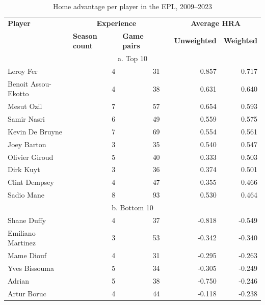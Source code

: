 \begin{table}[htbp]
    \begin{spacing}{1.5}
    \small
    \centering
    \caption{Home advantage per player in the EPL, 2009--2023}
    \label{tab:hra_per_player}
    \begin{tabular}{lrrrrr}
        \toprule
        \toprule
        \textbf{Player} & \multicolumn{2}{c}{\textbf{Experience}} &       & \multicolumn{2}{c}{\textbf{Average HRA}} \\
        \cmidrule{2-3}\cmidrule{5-6}          & \multicolumn{1}{l}{\textbf{Season count}} & \multicolumn{1}{l}{\textbf{Game pairs}} &       & \multicolumn{1}{l}{\textbf{Unweighted}} & \multicolumn{1}{l}{\textbf{Weighted}} \\
        \midrule
        \multicolumn{6}{c}{a. Top 10} \\
        \midrule
        Leroy Fer & 4     & 31    &       & 0.857 & 0.717 \\
        Benoit Assou-Ekotto & 4     & 38    &       & 0.631 & 0.640 \\
        Mesut Ozil & 7     & 57    &       & 0.654 & 0.593 \\
        Samir Nasri & 6     & 49    &       & 0.559 & 0.575 \\
        Kevin De Bruyne & 7     & 69    &       & 0.554 & 0.561 \\
        Joey Barton & 3     & 35    &       & 0.540 & 0.547 \\
        Olivier Giroud & 5     & 40    &       & 0.333 & 0.503 \\
        Dirk Kuyt & 3     & 36    &       & 0.374 & 0.501 \\
        Clint Dempsey & 4     & 47    &       & 0.355 & 0.466 \\
        Sadio Mane & 8     & 93    &       & 0.530 & 0.464 \\
        \midrule
        \multicolumn{6}{c}{b. Bottom 10} \\
        \midrule
        Shane Duffy & 4     & 37    &       & -0.818 & -0.549 \\
        Emiliano Martinez & 3     & 53    &       & -0.342 & -0.340 \\
        Mame Diouf & 4     & 31    &       & -0.295 & -0.263 \\
        Yves Bissouma & 5     & 34    &       & -0.305 & -0.249 \\
        Adrian & 5     & 38    &       & -0.750 & -0.246 \\
        Artur Boruc & 4     & 44    &       & -0.118 & -0.238 \\

\end{tabular}
\end{spacing}
\end{table}

